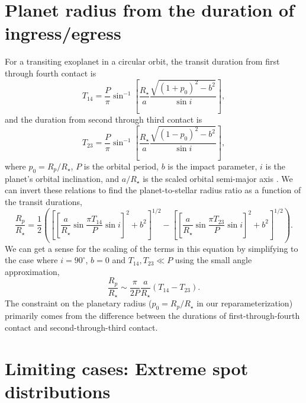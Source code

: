 \begin{subappendices}

\section{Planet radius from the duration of ingress/egress} \label{sec:simpleeqns}

For a transiting exoplanet in a circular orbit, the transit duration from first through fourth contact is
\begin{equation}
T _ {14} = \frac { P } { \pi } \sin ^ { - 1} \left[ \frac { R _ { \star } } { a } \frac { \sqrt { ( 1+ p_0 ) ^ { 2} - b ^ { 2} } } { \sin i } \right],
\end{equation}
and the duration from second through third contact is
\begin{equation}
T _ {23} = \frac { P } { \pi } \sin ^ { - 1} \left[ \frac { R _ { \star } } { a } \frac { \sqrt { ( 1- p_0 ) ^ { 2} - b ^ { 2} } } { \sin i } \right],
\end{equation}
where $p_0 = R_p/R_\star$, $P$ is the orbital period, $b$ is the impact parameter, $i$ is the planet's orbital inclination, and $a/R_\star$ is the scaled orbital semi-major axis \citep{Winn2011}. We can invert  these relations to find the planet-to-stellar radius ratio as a function of the transit durations,
\begin{equation}
\frac{R_p}{R_\star} = \frac{1}{2} \left( \left[ \left[ \frac{a}{R_\star}\sin{\frac{\pi T_{14}}{P}}\sin{i}\right]^2 + b^2\right]^{1/2} - \left[ \left [ \frac{a}{R_\star}\sin{\frac{\pi T_{23}}{P}}\sin{i}\right]^2 + b^2 \right ]^{1/2} \right).
\end{equation}
We can get a sense for the scaling of the terms in this equation by simplifying to the case where $i=90^\circ$, $b=0$ and $T_{14}, T_{23} \ll P$ using the small angle approximation,
\begin{equation}
\frac{R_p}{R_\star} \sim \frac{\pi}{2P} \frac{a}{R_\star} \left( T_{14} - T_{23}\right).
\end{equation}
The constraint on the planetary radius ($p_0=R_p/R_\star$ in our reparameterization) primarily comes from the difference between the durations of first-through-fourth contact and second-through-third contact. 

\section{Limiting cases: Extreme spot distributions} \label{sec:limitingcases}


\end{subappendices}
